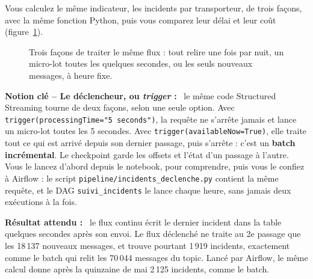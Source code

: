 \documentclass[11pt,a4paper]{article}
\newenvironment{resultat}{\par\medskip\noindent\textbf{Résultat attendu :}\ }{\par\medskip}
\newcommand{\cmd}[1]{\texttt{#1}}
\newenvironment{notion}[1][]{\par\medskip\noindent\textbf{\textcolor{lhblue}{Notion clé\if\relax\detokenize{#1}\relax\else{} -- #1\fi{} :}}\ }{\par\medskip}
\begin{document}
Vous calculez le même indicateur, les incidents par transporteur, de trois façons, avec la même
fonction Python, puis vous comparez leur délai et leur coût (figure~\ref{fig:modes}).

\begin{figure}[H]
\centering
{}
\caption{Trois façons de traiter le même flux : tout relire une fois par nuit, un micro-lot toutes
les quelques secondes, ou les seuls nouveaux messages, à heure fixe.}
\label{fig:modes}
\end{figure}

\begin{notion}[Le déclencheur, ou \emph{trigger}]
le même code Structured Streaming tourne de deux
façons, selon une seule option. Avec \cmd{trigger(processingTime="5 seconds")}, la requête ne
s'arrête jamais et lance un micro-lot toutes les 5 secondes. Avec \cmd{trigger(availableNow=True)},
elle traite tout ce qui est arrivé depuis son dernier passage, puis s'arrête : c'est un
\textbf{batch incrémental}. Le checkpoint garde les offsets et l'état d'un passage à l'autre.
Vous le lancez d'abord depuis le notebook, pour comprendre, puis vous le confiez à Airflow : le
script \cmd{pipeline/incidents\_declenche.py} contient la même requête, et le DAG
\cmd{suivi\_incidents} le lance chaque heure, sans jamais deux exécutions à la fois.
\end{notion}

\begin{resultat}
le flux continu écrit le dernier incident dans la table quelques secondes après son envoi. Le flux
déclenché ne traite au 2e passage que les 18\,137 nouveaux messages, et trouve pourtant 1\,919
incidents, exactement comme le batch qui relit les 70\,044 messages du topic. Lancé par Airflow,
le même calcul donne après la quinzaine de mai 2\,125 incidents, comme le batch.
\end{resultat}
\end{document}
